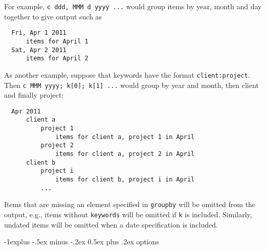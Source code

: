 \documentclass[10pt,landscape]{article}
\makeatletter
\renewcommand{\subsection}{\@startsection{subsection}{2}{0mm}%
                                {-1explus -.5ex minus -.2ex}%
                                {0.5ex plus .2ex}%
                                {\normalfont\normalsize\bfseries}}
\makeatother
\begin{document}
\begin{multicols}{3}
\vskip3pt
For example, \verb!c ddd, MMM d yyyy ...! would group items by year, month and day together to give output such as
\begin{verbatim}
  Fri, Apr 1 2011
      items for April 1
  Sat, Apr 2 2011
      items for April 2
\end{verbatim}

As another example, suppose that keywords have the format \verb!client:project!. Then \verb!c MMM yyyy; k[0]; k[1] ...! would group by year and month, then client and finally project:

\begin{verbatim}
  Apr 2011
      client a
          project 1
              items for client a, project 1 in April
          project 2
              items for client a, project 2 in April
      client b
          project i
              items for client b, project i in April
          ...
\end{verbatim}

Items that are missing an element specified in \verb'groupby' will be omitted from the output, e.g., items without \verb'keywords' will be omitted if \verb'k' is included. Similarly, undated items will be omitted when a date specification is included.


\subsection{options}


\end{multicols}
\end{document}
